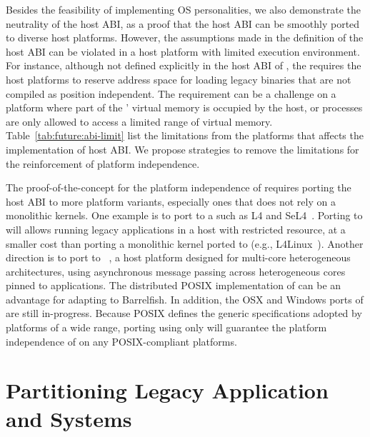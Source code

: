 Besides the feasibility of implementing OS personalities,
we also demonstrate the neutrality of the host ABI,
as a proof that the host ABI can be smoothly ported to diverse host platforms.
However, the assumptions made in the definition of the host ABI
can be violated in a host platform with limited execution environment.
For instance, although not defined explicitly in the host ABI of \graphene{},
the \picoprocs{} requires the host platforms
to reserve address space for loading legacy binaries that are not compiled as position independent.
The requirement can be a challenge on a platform
where part of the \picoprocs{}' virtual memory is occupied by the host,
or processes are only allowed to access a limited range of virtual memory.
Table~\ref{tab:future:abi-limit}
list the limitations from the platforms that affects the implementation of host ABI.
We propose strategies to remove the limitations for the reinforcement of platform independence.


The proof-of-the-concept for the platform independence of \graphene{}
requires porting the host ABI to more platform variants,
especially ones that does not rely on a monolithic kernels.
One example is to port \graphene{} to a \term{\microkernel{}}
such as L4 and SeL4~\citep{l4family, klein09sel4}.
Porting \picoprocs{} to \microkernel{} will allows running legacy applications
in a host with restricted resource,
at a smaller cost than porting a monolithic kernel ported to \microkernel{}
(e.g., L4Linux~\citep{hartig97mu}).
Another direction is to port \graphene{} to ~\citep{baumann09barrelfish},
a host platform designed for multi-core heterogeneous architectures,
using asynchronous message passing across heterogeneous cores pinned to applications.
The distributed POSIX implementation of \graphene{}
can be an advantage for adapting to Barrelfish.
In addition, the OSX and Windows ports of \graphene{} are still in-progress.
Because POSIX defines the generic specifications
adopted by platforms of a wide range,
porting \graphene{}
using only  will
guarantee the platform independence of \graphene{}
on any POSIX-compliant platforms.




\section{Partitioning Legacy Application and Systems}



